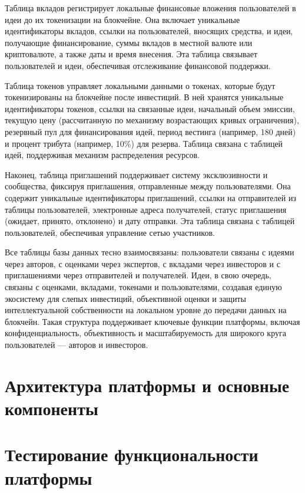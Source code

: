 \documentclass[
    candidate, %
    subf, %
    dotsinheaders=false,
]{disser}
\begin{document}
Таблица вкладов регистрирует локальные финансовые вложения пользователей в идеи до их токенизации на блокчейне. Она включает уникальные идентификаторы вкладов, ссылки на пользователей, вносящих средства, и идеи, получающие финансирование, суммы вкладов в местной валюте или криптовалюте, а также даты и время внесения. Эта таблица связывает пользователей и идеи, обеспечивая отслеживание финансовой поддержки.

Таблица токенов управляет локальными данными о токенах, которые будут токенизированы на блокчейне после инвестиций. В ней хранятся уникальные идентификаторы токенов, ссылки на связанные идеи, начальный объем эмиссии, текущую цену (рассчитанную по механизму возрастающих кривых ограничения), резервный пул для финансирования идей, период вестинга (например, 180 дней) и процент трибута (например, 10\%) для резерва. Таблица связана с таблицей идей, поддерживая механизм распределения ресурсов.

Наконец, таблица приглашений поддерживает систему эксклюзивности и сообщества, фиксируя приглашения, отправленные между пользователями. Она содержит уникальные идентификаторы приглашений, ссылки на отправителей из таблицы пользователей, электронные адреса получателей, статус приглашения (ожидает, принято, отклонено) и дату отправки. Эта таблица связана с таблицей пользователей, обеспечивая управление сетью участников.

Все таблицы базы данных тесно взаимосвязаны: пользователи связаны с идеями через авторов, с оценками через экспертов, с вкладами через инвесторов и с приглашениями через отправителей и получателей. Идеи, в свою очередь, связаны с оценками, вкладами, токенами и пользователями, создавая единую экосистему для слепых инвестиций, объективной оценки и защиты интеллектуальной собственности на локальном уровне до передачи данных на блокчейн. Такая структура поддерживает ключевые функции платформы, включая конфиденциальность, объективность и масштабируемость для широкого круга пользователей — авторов и инвесторов.

\section{Архитектура платформы и основные компоненты}

\section{Тестирование функциональности платформы}
\end{document}
